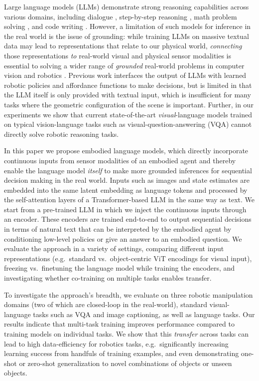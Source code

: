 Large language models (LLMs) demonstrate strong reasoning capabilities across various domains, including dialogue \cite{glaese2022improving,thoppilan2022lamda}, step-by-step reasoning \cite{wei2022chain,kojima2022large}, math problem solving \cite{lewkowycz2022solving,polu2022formal}, and code writing \cite{chen2021evaluating}.
However, a limitation of such models for inference in the real world is the issue of
grounding: while training LLMs on massive textual
data may lead to representations that relate to our
physical world, \emph{connecting} those representations \emph{to} real-world visual
and physical sensor modalities is essential to solving a wider range of \emph{grounded} real-world
problems in computer vision and robotics \cite{tellex2020robots}.
Previous work \citep{ahn2022can} interfaces the output of LLMs with learned robotic
policies and affordance functions to make decisions,
but is limited in that the LLM itself is only provided with textual
input, which is insufficient for many tasks where the geometric configuration of the scene is important.
Further, in our experiments we show that current state-of-the-art \emph{visual}-language models trained on typical vision-language tasks such as visual-question-answering (VQA) cannot directly solve robotic reasoning tasks.

In this paper we propose embodied language models, which
directly incorporate continuous inputs from sensor modalities of an
embodied agent and thereby enable the language model \emph{itself} to
make more grounded inferences for sequential decision making in the real world.
Inputs such as images and state estimates are embedded into the same latent embedding
as language tokens and processed by the self-attention layers of a
Transformer-based LLM in the same way as text.
We start from a pre-trained LLM in which we inject the continuous inputs through an encoder.
These encoders are trained end-to-end to output sequential decisions in terms of natural text that can be interpreted by the embodied agent by conditioning low-level policies or give an answer to an embodied question.
We evaluate the approach in a variety of settings, comparing different input representations (e.g.\ standard vs.\ object-centric ViT encodings for visual input), freezing vs.\ finetuning the language model while training the encoders, and investigating whether co-training on multiple tasks enables transfer.

To investigate the approach's breadth, we evaluate on three robotic manipulation domains (two of which are closed-loop in the real-world), standard visual-language tasks such as VQA and image captioning, as well as language tasks.
Our results indicate that multi-task training improves performance compared to training models on individual tasks.
We show that this \emph{transfer} across tasks can lead to high data-efficiency for robotics tasks, e.g.\ significantly increasing learning success from handfuls of training examples, and even demonstrating one-shot or zero-shot generalization to novel combinations of objects or unseen objects.

